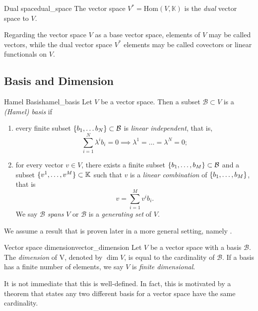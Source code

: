 \begin{definition}{Dual space}{dual_space}
    The vector space \(V^\ast = \mathrm{Hom}(V, \mathbb{K})\) is the \emph{dual} vector space to \(V\).
\end{definition}
\begin{remark}
    Regarding the vector space \(V\) as a base vector space, elements of \(V\) may be called vectors, while the dual vector space \(V ^{\ast}\) elements may be called covectors or linear functionals on \(V\).
\end{remark}

\subsection{Basis and Dimension}

\begin{definition}{Hamel Basis}{hamel_basis}
    Let \(V\) be a vector space. Then a subset \(\mathcal{B} \subset V\) is a \emph{(Hamel) basis} if
    \begin{enumerate}[label=(\alph*)]
        \item every finite subset \(\{b_1, \dots b_N\} \subset \mathcal{B}\) is \emph{linear independent}, that is,
            \begin{equation*}
                \sum_{i = 1}^N \lambda^i b_i = 0 \implies \lambda^1 = \dots = \lambda^N = 0;
            \end{equation*}
        \item for every vector \(v \in V\), there exists a finite subset \(\{b_1, \dots, b_M\} \subset \mathcal{B}\) and a subset \(\{v^1, \dots, v^M\} \subset \mathbb{K}\) such that \(v\) is a \emph{linear combination} of \(\{b_1, \dots, b_M\}\), that is
        \begin{equation*}
            v = \sum_{i=1}^M v^ib_i.
        \end{equation*}
        We say \(\mathcal{B}\) \emph{spans} \(V\) or \(\mathcal{B}\) is a \emph{generating set} of \(V\).
    \end{enumerate}
\end{definition}

We assume a result that is proven later in a more general setting, namely .

\begin{definition}{Vector space dimension}{vector_dimension}
    Let \(V\) be a vector space with a basis \(\mathcal{B}\). The \emph{dimension} of V, denoted by \(\dim{V}\), is equal to the cardinality of \(\mathcal{B}\). If a basis has a finite number of elements, we say \(V\) is \emph{finite dimensional}.
\end{definition}
\begin{remark}
    It is not immediate that this is well-defined. In fact, this is motivated by a theorem that  states any two different basis for a vector space have the same cardinality.
\end{remark}

